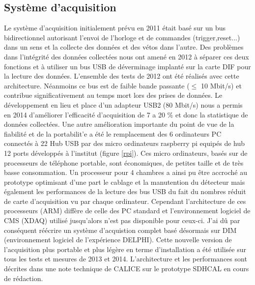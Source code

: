 \documentclass[9pt,french]{article}
\begin{document}
\subsection*{Syst\`eme d'acquisition}
Le syst\`eme d'acquisition initialement pr\'evu en 2011 \'etait bas\'e sur un bus bidirectionnel autorisant l'envoi de l'horloge et de commandes (trigger,reset...) dans un sens et la collecte des donn\'ees et des v\'etos dans l'autre. Des probl\`emes dans l'int\'egrit\'e des donn\'ees collect\'ees nous ont amen\'e en 2012 \`a s\'eparer ces deux fonctions et \`a utiliser un bus USB de d\'everminage implant\'e sur la carte DIF pour la lecture des donn\'ees. L'ensemble des tests de 2012 ont \'et\'e r\'ealis\'es avec cette architecture. N\'eanmoins ce bus est de faible bande passante ($\le$ 10 Mbit/s) et contribue significativement au temps mort lors des prises de donn\'ees. Le d\'eveloppement en lieu et place  d'un adapteur USB2 (80 Mbit/s) nous a permis en 2014 d'am\'eliorer l'efficacit\'e d'acquisition de 7 a 20 \% et donc la statistique de donn\'ees collect\'ees. Une autre am\'elioration importante du point de vue de la fiabilit\'e et de la portabilit'e a \'et\'e le remplacement des 6 ordinateurs PC connect\'es \`a 22 Hub USB par des micro ordinateurs raspberry pi equip\'es de hub 12 ports d\'evelopp\'es \`a l'institut (figure \ref{rpi}). Ces micro ordinateurs, bas\'es sur de processeurs de t\'el\'ephone portable, sont \'economiques, de petites taille et de tr\`es basse consommation. Un processeur pour 4 chambres a ainsi pu \^etre accroch\'e au prototype optimisant d'une part le cablage et la manutention du d\'etecteur mais \'egalement les performances de la lecture des bus USB du fait du nombres r\'eduit de carte d'acquisition vu par chaque ordinateur. Cependant l'architecture de ces processeurs (ARM) diff\`ere de celle des PC standard et  l'environnement logiciel de CMS (XDAQ) utilis\'e jusqu'alors n'est pas disponible pour ceux-ci. J'ai d\^u par cons\'equent r\'e\'ecrire un syst\`eme d'acquistion complet bas\'e d\'esormais sur DIM (environnement logiciel de l'exp\'erience DELPHI). Cette nouvelle version de l'acquisition plus portable et plus l\'eg\`ere en terme d'installation a \'et\'e utilis\'ee sur tous les tests et mesures de 2013 et 2014. L'architecture et les performances sont d\'ecrites dans une note technique de CALICE sur le prototype SDHCAL en cours de r\'edaction.       
\end{document}
